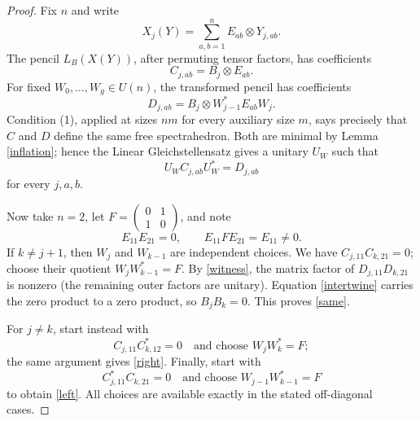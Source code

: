 \documentclass[11pt]{article}
\begin{document}
\begin{proof}
Fix $n$ and write
\[
 X_j(Y)=\sum_{a,b=1}^n E_{ab}\otimes Y_{j,ab}.
\]
The pencil $L_B(X(Y))$, after permuting tensor factors, has coefficients
\[
 C_{j,ab}=B_j\otimes E_{ab}.
\]
For fixed $W_0,\ldots,W_g\in U(n)$, the transformed pencil has coefficients
\[
 D_{j,ab}=B_j\otimes W_{j-1}^*E_{ab}W_j.
\]
Condition (1), applied at sizes $nm$ for every auxiliary size $m$, says
precisely that $C$ and $D$ define the same free spectrahedron.  Both are
minimal by Lemma \ref{inflation}; hence the Linear Gleichstellensatz gives a
unitary $U_W$ such that
\begin{equation}\label{intertwine}
 U_WC_{j,ab}U_W^*=D_{j,ab}
\end{equation}
for every $j,a,b$.

Now take $n=2$, let $F=\left(\begin{smallmatrix}0&1\\1&0\end{smallmatrix}\right)$,
and note
\begin{equation}\label{witness}
 E_{11}E_{21}=0,
 \qquad E_{11}FE_{21}=E_{11}\ne0.
\end{equation}
If $k\ne j+1$, then $W_j$ and $W_{k-1}$ are independent choices.  We have
$C_{j,11}C_{k,21}=0$; choose their quotient
$W_jW_{k-1}^*=F$.  By \eqref{witness}, the matrix factor of
$D_{j,11}D_{k,21}$ is nonzero (the remaining outer factors are unitary).
Equation \eqref{intertwine} carries the zero product to a zero product, so
$B_jB_k=0$.  This proves \eqref{same}.

For $j\ne k$, start instead with
\[
 C_{j,11}C_{k,12}^*=0
 \quad\text{and choose }W_jW_k^*=F;
\]
the same argument gives \eqref{right}.  Finally, start with
\[
 C_{j,11}^*C_{k,21}=0
 \quad\text{and choose }W_{j-1}W_{k-1}^*=F
\]
to obtain \eqref{left}.  All choices are available exactly in the stated
off-diagonal cases.
\end{proof}
\end{document}
